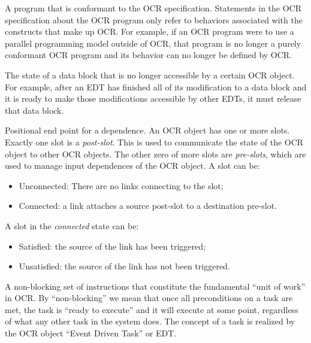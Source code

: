 \glossarydefstart
A program that is conformant to the OCR specification. Statements in
the OCR specification about the OCR program only refer to behaviors
associated with the constructs that make up OCR. For example, if an
OCR program were to use a parallel programming model outside of OCR,
that program is no longer a purely conformant OCR program and its
behavior can no longer be defined by OCR.
\glossarydefend

\glossarydefstart
The state of a data block that is no longer accessible by a certain OCR
object. For example, after an EDT has finished all of its
modification to a data block and it is ready to make those
modifications accessible by other EDTs, it must release that data
block.
\glossarydefend

\glossarydefstart
Positional end point for a dependence. An OCR object has one or more
slots. Exactly one slot is a \emph{post-slot}. This is used to
communicate the state of the OCR object to other OCR objects. The
other zero of more slots are \emph{pre-slots}, which are used to manage
input dependences of the OCR object. A slot can be:
\begin{itemize}
\item Unconnected: There are no links connecting to the slot;
\item Connected: a link attaches a source post-slot to a destination pre-slot.
\end{itemize}
A slot in the \emph{connected} state can be:
\begin{itemize}
\item Satisfied: the source of the link has been triggered;
\item Unsatisfied: the source of the link has not been triggered.
\end{itemize}
\glossarydefend

\glossarydefstart
A non-blocking set of instructions that constitute the fundamental
``unit of work'' in OCR.  By ``non-blocking'' we mean that once all
preconditions on a task are met, the task is ``ready to execute''
and it will execute at some point,
regardless of what any other task in the system does. The concept of
a task is realized by the OCR object ``Event Driven Task'' or EDT.
\glossarydefend


